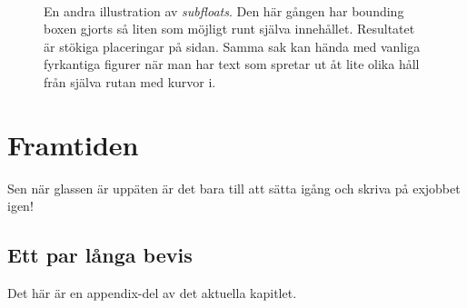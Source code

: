 \begin{figure}[tbp]
  \centering
  \qquad
  \\
  \qquad
  \caption{\label{fig:times2}%
    En andra illustration av \emph{subfloats}.  Den här gången har bounding boxen gjorts så liten som möjligt runt själva innehållet.  Resultatet är stökiga placeringar på sidan.  Samma sak kan hända med vanliga fyrkantiga figurer när man har text som spretar ut åt lite olika håll från själva rutan med kurvor i.}
\end{figure}

\section{Framtiden}

Sen när glassen är uppäten är det bara till att sätta igång och skriva på exjobbet igen!


\begin{chapter-appendix}

\section{Ett par långa bevis}
%
Det här är en appendix-del av det aktuella kapitlet.

\end{chapter-appendix}
